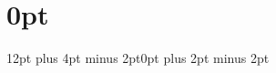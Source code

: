 \renewcommand\thesection{\arabic{section}}
\titlespacing\section{0pt}{12pt plus 4pt minus 2pt}{0pt plus 2pt minus 2pt}

\setcounter{tocdepth}{1}

\makeatletter
\patchcmd{\l@part}{\addvspace{2.25em \@plus\p@}}{\addvspace{0.8em \@plus\p@}}{}{}

\renewcommand*\l@section[2]{%
  \ifnum \c@tocdepth >\z@
    \addpenalty\@secpenalty
    \addvspace{0.1em \@plus\p@}%
    \begingroup
      \renewcommand\numberline[1]{}%
      \parindent \z@ \leftskip 1.5em \rightskip \@pnumwidth
      \parfillskip -\@pnumwidth
      \leavevmode \small
      #1\nobreak\hfil \nobreak\hb@xt@\@pnumwidth{\hss #2}\par
    \endgroup
  \fi}
\makeatother
\usepackage[
  giveninits=true,
  style=authoryear,
  backend=bibtex,
  maxcitenames=2,
  maxbibnames=99,
  hyperref=true,
  backref=false,
  sorting=nyt,
  uniquename=init,
  autolang=hyphen,
  dashed=false]{biblatex}

